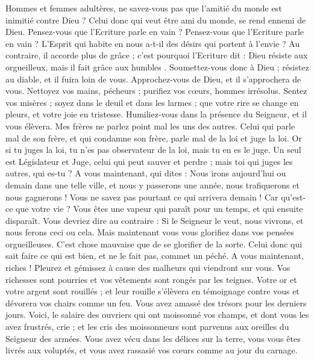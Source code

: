 \begin{multicols}{2}
Hommes et femmes adultères, ne savez-vous pas que l'amitié du monde est inimitié contre Dieu ? Celui donc qui veut être ami du monde, se rend ennemi de Dieu.
Pensez-vous que l'Ecriture parle en vain ? Pensez-vous que l'Ecriture parle en vain ? L'Esprit qui habite en nous a-t-il des désirs qui portent à l'envie ?
Au contraire, il accorde plus de grâce ; c'est pourquoi l'Ecriture dit : Dieu résiste aux orgueilleux, mais il fait grâce aux humbles{} .
Soumettez-vous donc à Dieu ; résistez au diable, et il fuira loin de vous.
Approchez-vous de Dieu, et il s'approchera de vous. Nettoyez vos mains, pécheurs ; purifiez vos cœurs, hommes irrésolus.
Sentez vos misères ; soyez dans le deuil et dans les larmes ; que votre rire se change en pleurs, et votre joie en tristesse.
Humiliez-vous dans la présence du Seigneur, et il vous élèvera.
Mes frères ne parlez point mal les uns des autres. Celui qui parle mal de son frère, et qui condamne son frère, parle mal de la loi et juge la loi. Or si tu juges la loi, tu n'es pas observateur de la loi, mais tu en es le juge.
Un seul est Législateur et Juge, celui qui peut sauver et perdre ; mais toi qui juges les autres, qui es-tu ?
A vous maintenant, qui dites : Nous irons aujourd'hui ou demain dans une telle ville, et nous y passerons une année, nous trafiquerons et nous gagnerons !
Vous ne savez pas pourtant ce qui arrivera demain ! Car qu’est-ce que votre vie ? Vous êtes une vapeur qui paraît pour un temps, et qui ensuite disparaît.
Vous devriez dire au contraire : Si le Seigneur le veut, nous vivrons, et nous ferons ceci ou cela.
Mais maintenant vous vous glorifiez dans vos pensées orgueilleuses. C’est chose mauvaise que de se glorifier de la sorte.
Celui donc qui sait faire ce qui est bien, et ne le fait pas, commet un péché.
\VerseOne{}A vous maintenant, riches ! Pleurez et gémissez à cause des malheurs qui viendront sur vous.
Vos richesses sont pourries et vos vêtements sont rongés par les teignes.
Votre or et votre argent sont rouillés ; et leur rouille s’élèvera en témoignage contre vous et dévorera vos chairs comme un feu. Vous avez amassé des trésors pour les derniers jours.
Voici, le salaire des ouvriers qui ont moissonné vos champs, et dont vous les avez frustrés, crie ; et les cris des moissonneurs sont parvenus aux oreilles du Seigneur des armées.
Vous avez vécu dans les délices sur la terre, vous vous êtes livrés aux voluptés, et vous avez rassasié vos cœurs comme au jour du carnage.

\end{multicols}
